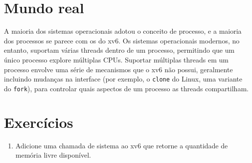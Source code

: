 \section{Mundo real}

A maioria dos sistemas operacionais adotou o conceito de processo, e a maioria
dos processos se parece com os do xv6. Os sistemas operacionais modernos, no entanto,
suportam várias threads dentro de um processo, permitindo que um único processo
explore múltiplas CPUs. Suportar múltiplas threads em um
processo envolve uma série de mecanismos que o xv6 não possui,
geralmente incluindo mudanças na interface (por exemplo, o
\lstinline{clone} do Linux,
uma variante do
\lstinline{fork}),
para controlar quais aspectos de
um processo as threads compartilham.
\section{Exercícios}

\begin{enumerate}

\item Adicione uma chamada de sistema ao xv6
que retorne a quantidade de memória livre disponível.


\end{enumerate}
